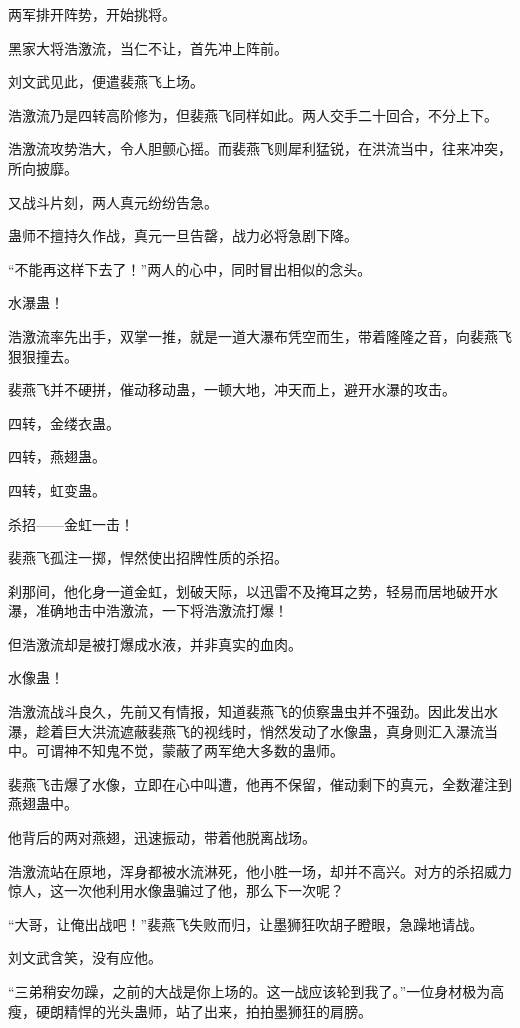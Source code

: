 \begin{this_body}
两军排开阵势，开始挑将。

黑家大将浩激流，当仁不让，首先冲上阵前。

刘文武见此，便遣裴燕飞上场。

浩激流乃是四转高阶修为，但裴燕飞同样如此。两人交手二十回合，不分上下。

浩激流攻势浩大，令人胆颤心摇。而裴燕飞则犀利猛锐，在洪流当中，往来冲突，所向披靡。

又战斗片刻，两人真元纷纷告急。

蛊师不擅持久作战，真元一旦告罄，战力必将急剧下降。

“不能再这样下去了！”两人的心中，同时冒出相似的念头。

水瀑蛊！

浩激流率先出手，双掌一推，就是一道大瀑布凭空而生，带着隆隆之音，向裴燕飞狠狠撞去。

裴燕飞并不硬拼，催动移动蛊，一顿大地，冲天而上，避开水瀑的攻击。

四转，金缕衣蛊。

四转，燕翅蛊。

四转，虹变蛊。

杀招——金虹一击！

裴燕飞孤注一掷，悍然使出招牌性质的杀招。

刹那间，他化身一道金虹，划破天际，以迅雷不及掩耳之势，轻易而居地破开水瀑，准确地击中浩激流，一下将浩激流打爆！

但浩激流却是被打爆成水液，并非真实的血肉。

水像蛊！

浩激流战斗良久，先前又有情报，知道裴燕飞的侦察蛊虫并不强劲。因此发出水瀑，趁着巨大洪流遮蔽裴燕飞的视线时，悄然发动了水像蛊，真身则汇入瀑流当中。可谓神不知鬼不觉，蒙蔽了两军绝大多数的蛊师。

裴燕飞击爆了水像，立即在心中叫遭，他再不保留，催动剩下的真元，全数灌注到燕翅蛊中。

他背后的两对燕翅，迅速振动，带着他脱离战场。

浩激流站在原地，浑身都被水流淋死，他小胜一场，却并不高兴。对方的杀招威力惊人，这一次他利用水像蛊骗过了他，那么下一次呢？

“大哥，让俺出战吧！”裴燕飞失败而归，让墨狮狂吹胡子瞪眼，急躁地请战。

刘文武含笑，没有应他。

“三弟稍安勿躁，之前的大战是你上场的。这一战应该轮到我了。”一位身材极为高瘦，硬朗精悍的光头蛊师，站了出来，拍拍墨狮狂的肩膀。


\end{this_body}
